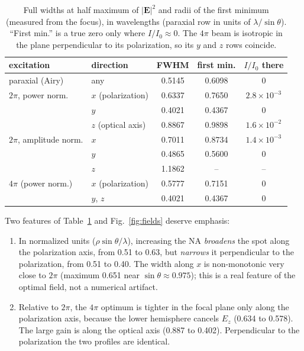\documentclass[11pt,letterpaper]{article}
\newcommand{\vect}[1]{\mathbf{#1}}
\newcommand{\Ev}{\vect{E}}
\begin{document}
\begin{table}[tb]
\centering
\caption{Full widths at half maximum of $|\Ev|^2$ and radii of the first minimum (measured from the focus), in wavelengths (paraxial row in units of $\lambda/\sin\theta$). ``First min.'' is a true zero only where $I/I_0\approx0$. The $4\pi$ beam is isotropic in the plane perpendicular to its polarization, so its $y$ and $z$ rows coincide.}
\label{tab:widths}
\begin{tabular}{llccc}
\toprule
excitation & direction & FWHM & first min. & $I/I_0$ there\\
\midrule
paraxial (Airy) & any & 0.5145 & 0.6098 & 0\\
$2\pi$, power norm. & $x$ (polarization) & 0.6337 & 0.7650 & $2.8\times10^{-3}$\\
 & $y$ & 0.4021 & 0.4367 & 0\\
 & $z$ (optical axis) & 0.8867 & 0.9898 & $1.6\times10^{-2}$\\
$2\pi$, amplitude norm. & $x$ & 0.7011 & 0.8734 & $1.4\times10^{-3}$\\
 & $y$ & 0.4865 & 0.5600 & 0\\
 & $z$ & 1.1862 & -- & --\\
$4\pi$ (power norm.) & $x$ (polarization) & 0.5777 & 0.7151 & 0\\
 & $y$, $z$ & 0.4021 & 0.4367 & 0\\
\bottomrule
\end{tabular}
\end{table}

Two features of Table~\ref{tab:widths} and Fig.~\ref{fig:fields} deserve emphasis:
\begin{enumerate}
\item In normalized units ($\rho\sin\theta/\lambda$), increasing the NA \emph{broadens} the spot along the polarization axis, from 0.51 to 0.63, but \emph{narrows} it perpendicular to the polarization, from 0.51 to 0.40. The width along $x$ is non-monotonic very close to $2\pi$ (maximum 0.651 near $\sin\theta\approx0.975$); this is a real feature of the optimal field, not a numerical artifact.
\item Relative to $2\pi$, the $4\pi$ optimum is tighter in the focal plane only along the polarization axis, because the lower hemisphere cancels $E_z$ (0.634 to 0.578). The large gain is along the optical axis (0.887 to 0.402). Perpendicular to the polarization the two profiles are identical.
\end{enumerate}

\end{document}
